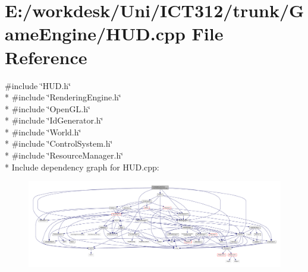 \section{E\+:/workdesk/\+Uni/\+I\+C\+T312/trunk/\+Game\+Engine/\+H\+U\+D.cpp File Reference}
\label{_h_u_d_8cpp}
{\ttfamily \#include \char`\"{}H\+U\+D.\+h\char`\"{}}\\*
{\ttfamily \#include \char`\"{}Rendering\+Engine.\+h\char`\"{}}\\*
{\ttfamily \#include \char`\"{}Open\+G\+L.\+h\char`\"{}}\\*
{\ttfamily \#include \char`\"{}Id\+Generator.\+h\char`\"{}}\\*
{\ttfamily \#include \char`\"{}World.\+h\char`\"{}}\\*
{\ttfamily \#include \char`\"{}Control\+System.\+h\char`\"{}}\\*
{\ttfamily \#include \char`\"{}Resource\+Manager.\+h\char`\"{}}\\*
Include dependency graph for H\+U\+D.\+cpp\+:\nopagebreak
\begin{figure}[H]
\begin{center}
\leavevmode
\includegraphics[width=350pt]{dc/dd6/_h_u_d_8cpp__incl}
\end{center}
\end{figure}
